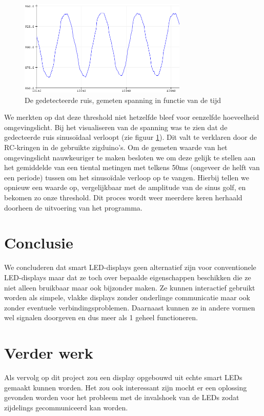 \documentclass{article}
\begin{document}
\begin{figure}
\centering
\includegraphics[width=8cm]{ruis.png}
\caption{De gedetecteerde ruis, gemeten spanning in functie van de tijd}
\label{fig:ruis}
\end{figure}

We merkten op dat deze threshold niet hetzelfde bleef voor eenzelfde hoeveelheid omgevingslicht. Bij het visualiseren van de spanning was te zien dat de gedecteerde ruis sinusoïdaal verloopt (zie figuur \ref{fig:ruis}). Dit valt te verklaren door de RC-kringen in de gebruikte zigduino's. Om de gemeten waarde van het omgevingslicht nauwkeuriger te maken besloten we om deze gelijk te stellen aan het gemiddelde van een tiental metingen met telkens 50ms (ongeveer de helft van een periode) tussen om het sinusoïdale verloop op te vangen. Hierbij tellen we opnieuw een waarde op, vergelijkbaar met de amplitude van de sinus golf, en bekomen zo onze threshold. Dit proces wordt weer meerdere keren herhaald doorheen de uitvoering van het programma.


\section{Conclusie}
We concluderen dat smart LED-displays geen alternatief zijn voor conventionele LED-displays maar dat ze toch over bepaalde eigenschappen beschikken die ze niet alleen bruikbaar maar ook bijzonder maken. Ze kunnen interactief gebruikt worden als simpele, vlakke displays zonder onderlinge communicatie maar ook zonder eventuele verbindingsproblemen. Daarnaast kunnen ze in andere vormen wel signalen doorgeven en dus meer als 1 geheel functioneren.


\section{Verder werk}
Als vervolg op dit project zou een display opgebouwd uit echte smart LEDs gemaakt kunnen worden. Het zou ook interessant zijn mocht er een oplossing gevonden worden voor het probleem met de invalshoek van de LEDs zodat zijdelings gecommuniceerd kan worden.




\end{document}
